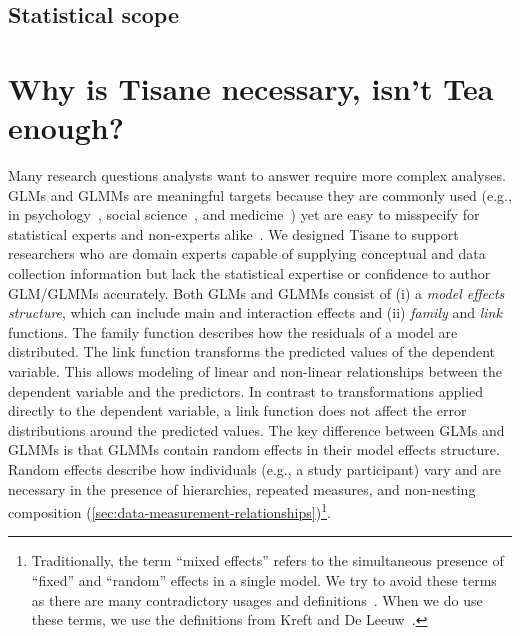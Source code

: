\subsection{Statistical scope}  \label{sec:GLM}
\section{Why is Tisane necessary, isn't Tea enough?}
Many research questions analysts want to answer require more complex analyses.
GLMs and GLMMs are meaningful targets because they are commonly
used (e.g., in psychology~\cite{lo2015transform,cohen2013applied}, social
science~\cite{kreft1998introducing}, and
medicine~\cite{bolker2009generalized,barr2013random}) yet are easy to misspecify
for statistical experts and non-experts alike~\cite{barr2013random,
cohen2013applied}. We designed Tisane to support researchers who are domain
experts capable of supplying conceptual and data collection information but lack
the statistical expertise or confidence to author GLM/GLMMs accurately.
Both GLMs and GLMMs consist of (i) a \textit{model effects structure},
which can include main and interaction effects and (ii) \textit{family} and
\textit{link} functions. The family function describes how the residuals of a
model are distributed. The link function transforms the predicted values of the
dependent variable. This allows modeling of linear and non-linear relationships
between the dependent variable and the predictors. In contrast to
transformations applied directly to the dependent variable, a link function does
not affect the error distributions around the predicted values. The key
difference between GLMs and GLMMs is that GLMMs contain random effects in their
model effects structure. Random effects describe how individuals (e.g., a study
participant) vary and are necessary in the presence of hierarchies, repeated
measures, and non-nesting composition
(\ref{sec:data-measurement-relationships})\footnote{Traditionally, the term
``mixed effects'' refers to the simultaneous presence of ``fixed'' and
``random'' effects in a single model. We try to avoid these terms as there are
many contradictory usages and definitions~\cite{gelmanFixedRandom}. When we do
use these terms, we use the definitions from Kreft and De
Leeuw~\cite{kreft1998introducing}.}.

